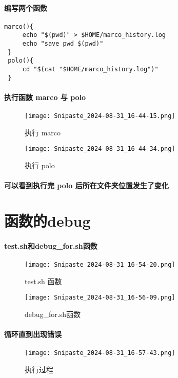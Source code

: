 \documentclass[a4paper, 12pt]{article}
\begin{document}
    \paragraph{编写两个函数}
    \begin{verbatim}
marco(){
     echo "$(pwd)" > $HOME/marco_history.log
     echo "save pwd $(pwd)"
 }
 polo(){
     cd "$(cat "$HOME/marco_history.log")"
 }
    \end{verbatim}

    \paragraph{执行函数 marco 与 polo}
    \begin{figure}[h]
        \centering
        \texttt{[image: Snipaste\_2024-08-31\_16-44-15.png]}
        \caption{执行 marco}
        \label{fig:执行marco}
    \end{figure}
    \begin{figure}[h]
        \centering
        \texttt{[image: Snipaste\_2024-08-31\_16-44-34.png]}
        \caption{执行 polo}
        \label{fig:执行polo}
    \end{figure}
    \paragraph{可以看到执行完 polo 后所在文件夹位置发生了变化}
    \newpage

    \section{函数的debug}
    \paragraph{test.sh和debug_for.sh函数}
    \begin{figure}[h]
        \centering
        \texttt{[image: Snipaste\_2024-08-31\_16-54-20.png]}
        \caption{test.sh 函数}
        \label{fig:test.sh}
    \end{figure}
    \begin{figure}
        \centering
        \texttt{[image: Snipaste\_2024-08-31\_16-56-09.png]}
        \caption{debug_for.sh函数}
        \label{fig:enter-label}
    \end{figure}
    
    
    
    \paragraph{循环直到出现错误}
    \begin{figure}[h]
        \centering
        \texttt{[image: Snipaste\_2024-08-31\_16-57-43.png]}
        \caption{执行过程}
        \label{fig:执行过程}
    \end{figure}
\end{document}
